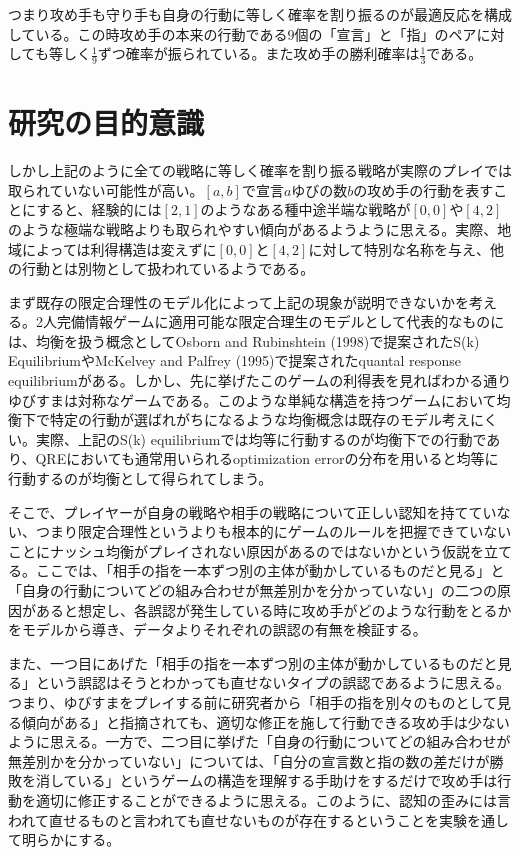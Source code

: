 \documentclass{jsarticle}
\begin{document}
つまり攻め手も守り手も自身の行動に等しく確率を割り振るのが最適反応を構成している。この時攻め手の本来の行動である$9$個の「宣言」と「指」のペアに対しても等しく$\frac{1}{9}$ずつ確率が振られている。また攻め手の勝利確率は$\frac{1}{3}$である。

\section{研究の目的意識}
しかし上記のように全ての戦略に等しく確率を割り振る戦略が実際のプレイでは取られていない可能性が高い。$[a,b]$で宣言$a$ゆびの数$b$の攻め手の行動を表すことにすると、経験的には$[2,1]$のようなある種中途半端な戦略が$[0,0]$や$[4,2]$のような極端な戦略よりも取られやすい傾向があるようように思える。実際、地域によっては利得構造は変えずに$[0,0]$と$[4,2]$に対して特別な名称を与え、他の行動とは別物として扱われているようである。

まず既存の限定合理性のモデル化によって上記の現象が説明できないかを考える。2人完備情報ゲームに適用可能な限定合理生のモデルとして代表的なものには、均衡を扱う概念としてOsborn and Rubinshtein (1998)で提案されたS(k) EquilibriumやMcKelvey and Palfrey (1995)で提案されたquantal response equilibriumがある。しかし、先に挙げたこのゲームの利得表を見ればわかる通りゆびすまは対称なゲームである。このような単純な構造を持つゲームにおいて均衡下で特定の行動が選ばれがちになるような均衡概念は既存のモデル考えにくい。実際、上記のS(k) equilibriumでは均等に行動するのが均衡下での行動であり、QREにおいても通常用いられるoptimization errorの分布を用いると均等に行動するのが均衡として得られてしまう。

そこで、プレイヤーが自身の戦略や相手の戦略について正しい認知を持てていない、つまり限定合理性というよりも根本的にゲームのルールを把握できていないことにナッシュ均衡がプレイされない原因があるのではないかという仮説を立てる。ここでは、「相手の指を一本ずつ別の主体が動かしているものだと見る」と「自身の行動についてどの組み合わせが無差別かを分かっていない」の二つの原因があると想定し、各誤認が発生している時に攻め手がどのような行動をとるかをモデルから導き、データよりそれぞれの誤認の有無を検証する。

また、一つ目にあげた「相手の指を一本ずつ別の主体が動かしているものだと見る」という誤認はそうとわかっても直せないタイプの誤認であるように思える。つまり、ゆびすまをプレイする前に研究者から「相手の指を別々のものとして見る傾向がある」と指摘されても、適切な修正を施して行動できる攻め手は少ないように思える。一方で、二つ目に挙げた「自身の行動についてどの組み合わせが無差別かを分かっていない」については、「自分の宣言数と指の数の差だけが勝敗を消している」というゲームの構造を理解する手助けをするだけで攻め手は行動を適切に修正することができるように思える。このように、認知の歪みには言われて直せるものと言われても直せないものが存在するということを実験を通して明らかにする。
\end{document}
